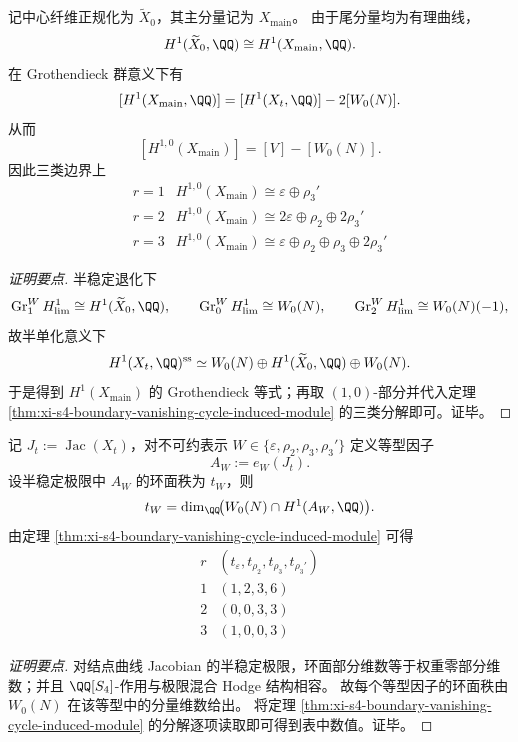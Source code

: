\begin{corollary}\label{cor:xi-s4-boundary-main-component-h10-decomposition}
记中心纤维正规化为 \(\widetilde X_0\)，其主分量记为 \(X_{\mathrm{main}}\)。
由于尾分量均为有理曲线，
\[
H^1(\widetilde X_0,\QQ)\cong H^1(X_{\mathrm{main}},\QQ).
\]
在 Grothendieck 群意义下有
\[
[H^1(X_{\mathrm{main}},\QQ)]
=[H^1(X_t,\QQ)]-2[W_0(N)].
\]
从而
\[
[H^{1,0}(X_{\mathrm{main}})]=[V]-[W_0(N)].
\]
因此三类边界上
\[
\begin{array}{c|l}
r=1 & H^{1,0}(X_{\mathrm{main}})\cong \varepsilon\oplus \rho_3'\\
\hline
r=2 & H^{1,0}(X_{\mathrm{main}})\cong 2\varepsilon\oplus \rho_2\oplus 2\rho_3'\\
\hline
r=3 & H^{1,0}(X_{\mathrm{main}})\cong \varepsilon\oplus \rho_2\oplus \rho_3\oplus 2\rho_3'
\end{array}
\]
\end{corollary}
\begin{proof}[证明要点]
半稳定退化下
\[
\operatorname{Gr}_1^W H^1_{\lim}\cong H^1(\widetilde X_0,\QQ),\qquad
\operatorname{Gr}_0^W H^1_{\lim}\cong W_0(N),\qquad
\operatorname{Gr}_2^W H^1_{\lim}\cong W_0(N)(-1),
\]
故半单化意义下
\[
H^1(X_t,\QQ)^{\mathrm{ss}}
\simeq W_0(N)\oplus H^1(\widetilde X_0,\QQ)\oplus W_0(N).
\]
于是得到 \(H^1(X_{\mathrm{main}})\) 的 Grothendieck 等式；再取 \((1,0)\)-部分并代入定理 \ref{thm:xi-s4-boundary-vanishing-cycle-induced-module} 的三类分解即可。证毕。
\end{proof}

\begin{theorem}\label{thm:xi-s4-isotypic-jacobian-toric-rank-by-boundary-type}
记 \(J_t:=\operatorname{Jac}(X_t)\)，对不可约表示 \(W\in\{\varepsilon,\rho_2,\rho_3,\rho_3'\}\) 定义等型因子
\[
A_W:=e_W(J_t).
\]
设半稳定极限中 \(A_W\) 的环面秩为 \(t_W\)，则
\[
t_W=\dim_{\QQ}\!\bigl(W_0(N)\cap H^1(A_W,\QQ)\bigr).
\]
由定理 \ref{thm:xi-s4-boundary-vanishing-cycle-induced-module} 可得
\[
\begin{array}{c|c}
r & (t_{\varepsilon},t_{\rho_2},t_{\rho_3},t_{\rho_3'})\\
\hline
1 & (1,2,3,6)\\
2 & (0,0,3,3)\\
3 & (1,0,0,3)
\end{array}
\]
\end{theorem}
\begin{proof}[证明要点]
对结点曲线 Jacobian 的半稳定极限，环面部分维数等于权重零部分维数；并且 \(\QQ[S_4]\)-作用与极限混合 Hodge 结构相容。
故每个等型因子的环面秩由 \(W_0(N)\) 在该等型中的分量维数给出。
将定理 \ref{thm:xi-s4-boundary-vanishing-cycle-induced-module} 的分解逐项读取即可得到表中数值。证毕。
\end{proof}

